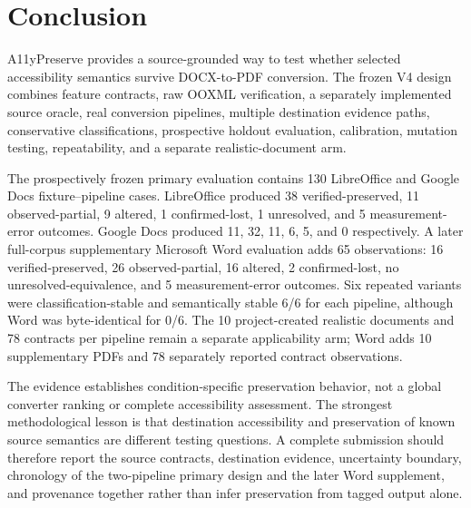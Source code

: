 \section{Conclusion}
\label{sec:conclusion}

A11yPreserve provides a source-grounded way to test whether selected accessibility semantics survive DOCX-to-PDF conversion. The frozen V4 design combines feature contracts, raw OOXML verification, a separately implemented source oracle, real conversion pipelines, multiple destination evidence paths, conservative classifications, prospective holdout evaluation, calibration, mutation testing, repeatability, and a separate realistic-document arm.

The prospectively frozen primary evaluation contains 130 LibreOffice and Google Docs fixture--pipeline cases. LibreOffice produced 38 verified-preserved, 11 observed-partial, 9 altered, 1 confirmed-lost, 1 unresolved, and 5 measurement-error outcomes. Google Docs produced 11, 32, 11, 6, 5, and 0 respectively. A later full-corpus supplementary Microsoft Word evaluation adds 65 observations: 16 verified-preserved, 26 observed-partial, 16 altered, 2 confirmed-lost, no unresolved-equivalence, and 5 measurement-error outcomes. Six repeated variants were classification-stable and semantically stable 6/6 for each pipeline, although Word was byte-identical for 0/6. The 10 project-created realistic documents and 78 contracts per pipeline remain a separate applicability arm; Word adds 10 supplementary PDFs and 78 separately reported contract observations.

The evidence establishes condition-specific preservation behavior, not a global converter ranking or complete accessibility assessment. The strongest methodological lesson is that destination accessibility and preservation of known source semantics are different testing questions. A complete submission should therefore report the source contracts, destination evidence, uncertainty boundary, chronology of the two-pipeline primary design and the later Word supplement, and provenance together rather than infer preservation from tagged output alone.
